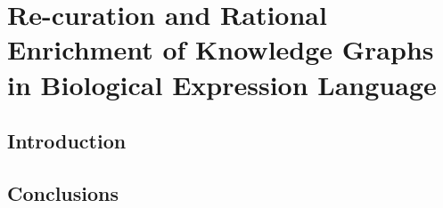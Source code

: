 \chapter{Re-curation and Rational Enrichment of Knowledge Graphs in Biological Expression Language}\label{chap:recuration}

\section*{Introduction}

\vspace*{\fill}



\section*{Conclusions}
